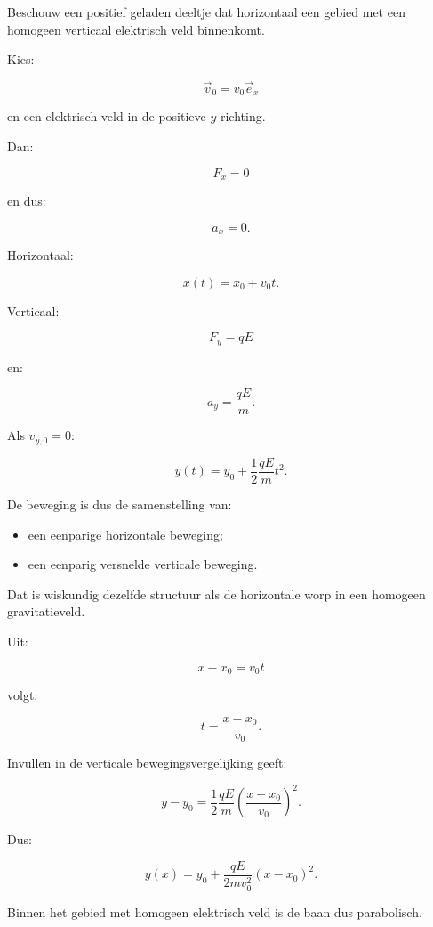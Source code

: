 \documentclass{ximera}
\begin{document}
Beschouw een positief geladen deeltje dat horizontaal een gebied met
een homogeen verticaal elektrisch veld binnenkomt.

Kies:

\[
\vec v_0=v_0\vec e_x
\]

en een elektrisch veld in de positieve $y$-richting.

Dan:

\[
F_x=0
\]

en dus:

\[
a_x=0.
\]

Horizontaal:

\[
\boxed{
x(t)=x_0+v_0t.
}
\]

Verticaal:

\[
F_y=qE
\]

en:

\[
a_y=\frac{qE}{m}.
\]

Als $v_{y,0}=0$:

\[
\boxed{
y(t)
=
y_0+\frac12\frac{qE}{m}t^2.
}
\]

De beweging is dus de samenstelling van:

\begin{itemize}
  \item een eenparige horizontale beweging;
  \item een eenparig versnelde verticale beweging.
\end{itemize}

Dat is wiskundig dezelfde structuur als de horizontale worp in een
homogeen gravitatieveld.



Uit:

\[
x-x_0=v_0t
\]

volgt:

\[
t=\frac{x-x_0}{v_0}.
\]

Invullen in de verticale bewegingsvergelijking geeft:

\[
y-y_0
=
\frac12\frac{qE}{m}
\left(\frac{x-x_0}{v_0}\right)^2.
\]

Dus:

\[
\boxed{
y(x)
=
y_0+
\frac{qE}{2mv_0^2}(x-x_0)^2.
}
\]

Binnen het gebied met homogeen elektrisch veld is de baan dus
parabolisch.
\end{document}
